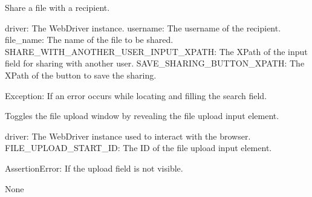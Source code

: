 \documentclass[letterpaper,10pt,english]{sphinxmanual}
\begin{document}

\begin{fulllineitems}
\label{\detokenize{utils:utils.file_management.share_file_with_recipient}}
\pysigstartsignatures
{}
\pysigstopsignatures
\sphinxAtStartPar
Share a file with a recipient.
\begin{description}
\sphinxAtStartPar
driver: The WebDriver instance.
username: The username of the recipient.
file\_name: The name of the file to be shared.
SHARE\_WITH\_ANOTHER\_USER\_INPUT\_XPATH: The XPath of the input field for sharing with another user.
SAVE\_SHARING\_BUTTON\_XPATH: The XPath of the button to save the sharing.

\sphinxAtStartPar
Exception: If an error occurs while locating and filling the search field.

\end{description}

\end{fulllineitems}


\begin{fulllineitems}
\label{\detokenize{utils:utils.file_management.toggle_file_upload}}
\pysigstartsignatures
{}
\pysigstopsignatures
\sphinxAtStartPar
Toggles the file upload window by revealing the file upload input element.
\begin{description}
\sphinxAtStartPar
driver: The WebDriver instance used to interact with the browser.
FILE\_UPLOAD\_START\_ID: The ID of the file upload input element.

\sphinxAtStartPar
AssertionError: If the upload field is not visible.

\sphinxAtStartPar
None

\end{description}

\end{fulllineitems}
\end{document}
